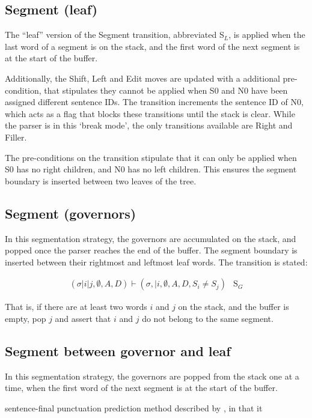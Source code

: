 \documentclass[11pt,letterpaper]{article}
\begin{document}
\subsection{Segment (leaf)}

The ``leaf'' version of the Segment transition, abbreviated S$_L$, is applied when
the last word of a segment is on the stack, and the first word of the next segment
is at the start of the buffer.

Additionally, the Shift, Left and Edit moves are updated with a additional
pre-condition, that stipulates they cannot be applied when S0 and N0 have
been assigned different sentence IDs.  The transition increments the sentence
ID of N0, which acts as a flag that blocks these transitions until the stack is clear.
While the parser is in this `break mode', the only transitions available are
Right and Filler.

The pre-conditions on the transition stipulate that it can only be applied when
S0 has no right children, and N0 has no left children.  This ensures the segment
boundary is inserted between two leaves of the tree.

\subsection{Segment (governors)}

In this segmentation strategy, the governors are accumulated on the stack, and
popped once the parser reaches the end of the buffer.  The segment boundary is
inserted between their rightmost and leftmost leaf words.
The transition is stated:

\begin{eqnarray}
    (\sigma | i | j, \emptyset , A, D) \vdash (\sigma, | i, \emptyset, A, D, S_i \ne S_j ) & \mathrm{S}_G
\end{eqnarray}

That is, if there are at least two words $i$ and $j$ on the stack, and the buffer
is empty, pop $j$ and assert that $i$ and $j$ do not belong to the same segment.

\subsection{Segment between governor and leaf}

In this segmentation strategy, the governors are popped from the stack one at
a time, when the first word of the next segment is at the start of the buffer.

sentence-final punctuation prediction method described by \citet{zhang:13},
in that it 
\end{document}
